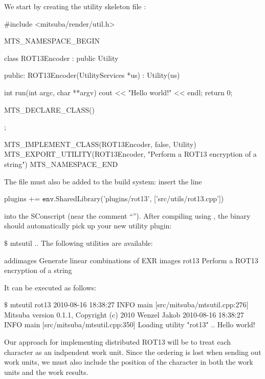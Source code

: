 We start by creating the utility skeleton file :
\begin{cpp}
#include <mitsuba/render/util.h>

MTS_NAMESPACE_BEGIN

class ROT13Encoder : public Utility {
public:
	ROT13Encoder(UtilityServices *us) : Utility(us) { }

	int run(int argc, char **argv) {
		cout << "Hello world!" << endl;
		return 0;
	}

	MTS_DECLARE_CLASS()
};

MTS_IMPLEMENT_CLASS(ROT13Encoder, false, Utility)
MTS_EXPORT_UTILITY(ROT13Encoder, "Perform a ROT13 encryption of a string")
MTS_NAMESPACE_END
\end{cpp}
The file must also be added to the build system: insert the line
\begin{shell}
plugins += $\texttt{env}$.SharedLibrary('plugins/rot13', ['src/utils/rot13.cpp'])
\end{shell}
into the SConscript (near the comment ``''). After compiling
using , the  binary should automatically pick up your new utility plugin:
\begin{shell}
$\texttt{\$}$ mtsutil
..
The following utilities are available:

	addimages             Generate linear combinations of EXR images
	rot13                 Perform a ROT13 encryption of a string
\end{shell}
It can be executed as follows:
\begin{shell}
$\texttt{\$}$ mtsutil rot13
2010-08-16 18:38:27 INFO  main [src/mitsuba/mtsutil.cpp:276] Mitsuba version 0.1.1, Copyright (c) 2010 Wenzel Jakob
2010-08-16 18:38:27 INFO  main [src/mitsuba/mtsutil.cpp:350] Loading utility "rot13" ..
Hello world!
\end{shell}

Our approach for implementing distributed ROT13 will be to treat each character as an 
indpendent work unit. Since the ordering is lost when sending out work units, we must
also include the position of the character in both the work units and the work results.

